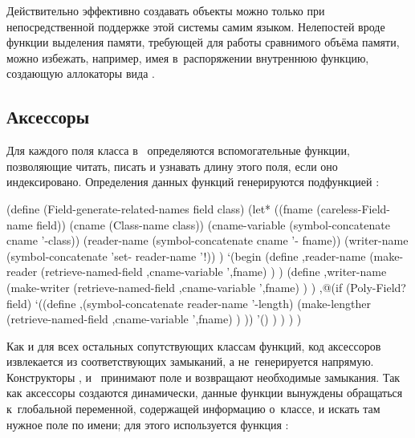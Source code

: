 Действительно эффективно создавать объекты {\Meroonet} можно только при
непосредственной поддержке этой системы самим языком. Нелепостей вроде функции
выделения памяти, требующей для работы сравнимого объёма памяти, можно избежать,
например, имея в~распоряжении внутреннюю функцию, создающую аллокаторы вида
.


\subsection{Аксессоры}\label{objects/accomp/ssect:access}

Для каждого поля класса в~{\Meroonet} определяются вспомогательные функции,
позволяющие читать, писать и узнавать длину этого поля, если оно индексировано.
Определения данных функций генерируются подфункцией
:


\begin{code:lisp}
(define (Field-generate-related-names field class)
  (let* ((fname (careless-Field-name field))
         (cname (Class-name class))
         (cname-variable (symbol-concatenate cname '-class))
         (reader-name (symbol-concatenate cname '- fname))
         (writer-name (symbol-concatenate 'set- reader-name '!)) )
    `(begin
       (define ,reader-name
         (make-reader
          (retrieve-named-field ,cname-variable ',fname) ) )
       (define ,writer-name
         (make-writer
          (retrieve-named-field ,cname-variable ',fname) ) )
       ,@(if (Poly-Field? field)
             `((define ,(symbol-concatenate reader-name '-length)
                 (make-lengther
                  (retrieve-named-field ,cname-variable ',fname) ) ))
             '() ) ) ) )
\end{code:lisp}


Как и для всех остальных сопутствующих классам функций, код аксессоров
извлекается из соответствующих замыканий, а не~генерируется напрямую.
Конструкторы ,  и~ принимают
поле и возвращают необходимые замыкания. Так как аксессоры создаются
динамически, данные функции вынуждены обращаться к~глобальной переменной,
содержащей информацию о~классе, и искать там нужное поле по имени; для этого
используется функция :

